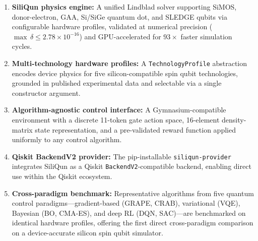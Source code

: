 \begin{enumerate}
  \item \textbf{SiliQun physics engine:} A unified Lindblad solver supporting SiMOS, donor-electron, GAA, Si/SiGe quantum dot, and SLEDGE qubits via configurable hardware profiles, validated at numerical precision ($\max\,\delta \leq 2.78 \times 10^{-16}$) and GPU-accelerated for $93\times$ faster simulation cycles.
  \item \textbf{Multi-technology hardware profiles:} A \texttt{TechnologyProfile} abstraction encodes device physics for five silicon-compatible spin qubit technologies, grounded in published experimental data and selectable via a single constructor argument.
  \item \textbf{Algorithm-agnostic control interface:} A Gymnasium-compatible environment with a discrete 11-token gate action space, 16-element density-matrix state representation, and a pre-validated reward function applied uniformly to any control algorithm.
  \item \textbf{Qiskit BackendV2 provider:} The pip-installable \texttt{siliqun-provider} integrates SiliQun as a Qiskit \texttt{BackendV2}-compatible backend, enabling direct use within the Qiskit ecosystem.
  \item \textbf{Cross-paradigm benchmark:} Representative algorithms from five quantum control paradigms—gradient-based (GRAPE, CRAB), variational (VQE), Bayesian (BO, CMA-ES), and deep RL (DQN, SAC)—are benchmarked on identical hardware profiles, offering the first direct cross-paradigm comparison on a device-accurate silicon spin qubit simulator.
\end{enumerate}